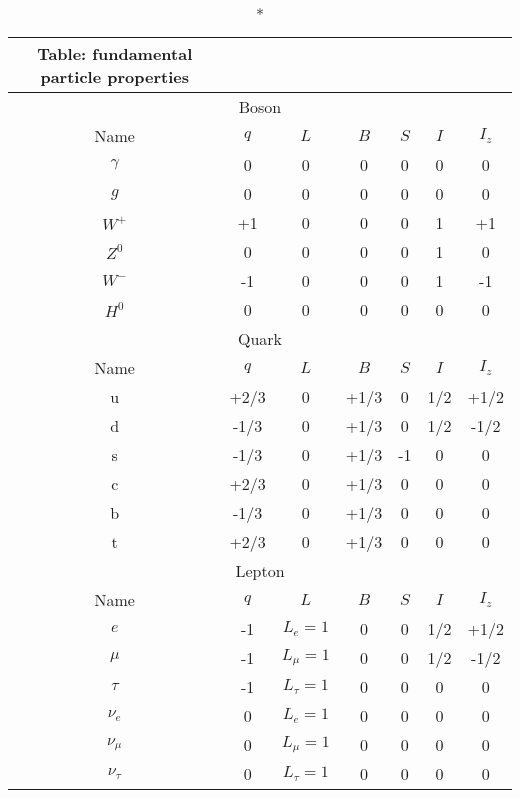 \documentclass[../../../main.tex]{subfiles}
\begin{document}
\begin{longtable}{ccccccc}
    \caption*{Table: fundamental particle properties}\\
    \toprule
    \multicolumn{7}{c}{Boson}\\
    \midrule
    Name & $q$  & $L$        & $B$  & $S$ & $I$ & $I_z$ \\
    \midrule
    $\gamma$    & 0    & 0          & 0    & 0   & 0   & 0     \\
    $g$    & 0    & 0          & 0    & 0   & 0   & 0     \\
    $W^+$   & +1   & 0          & 0    & 0   & 1   & +1    \\
    $Z^0$    & 0    & 0          & 0    & 0   & 1   & 0     \\
    $W^-$   & -1   & 0          & 0    & 0   & 1   & -1    \\
    $H^0$    & 0    & 0          & 0    & 0   & 0   & 0     \\
    \bottomrule
    \toprule
    \multicolumn{7}{c}{Quark}                           \\
    \midrule
    Name & $q$  & $L$        & $B$  & $S$ & $I$ & $I_z$ \\
    \midrule
    u    & +2/3 & 0       & +1/3 & 0   & 1/2 & +1/2  \\
    d    & -1/3 & 0        & +1/3 & 0   & 1/2 & -1/2  \\
    s    & -1/3 & 0        & +1/3 & -1  & 0   & 0     \\
    c    & +2/3 & 0        & +1/3 & 0   & 0   & 0     \\
    b    & -1/3 & 0        & +1/3 & 0   & 0   & 0     \\
    t    & +2/3 & 0        & +1/3 & 0   & 0   & 0     \\
    \bottomrule
    \toprule
    \multicolumn{7}{c}{Lepton}                          \\
    \midrule
    Name & $q$  & $L$        & $B$  & $S$ & $I$ & $I_z$ \\
    \midrule
    $e$    & -1   & $L_e=1$    & 0    & 0   & 1/2 & +1/2  \\
    $\mu$   & -1   & $L_\mu=1$  & 0    & 0   & 1/2 & -1/2  \\
    $\tau$  & -1   & $L_\tau=1$ & 0    & 0   & 0   & 0     \\
    $\nu_e$ & 0    & $L_e=1$    & 0    & 0   & 0   & 0     \\
    $\nu_\mu$ & 0    & $L_\mu=1$  & 0    & 0   & 0   & 0     \\
    $\nu_\tau$ & 0    & $L_\tau=1$ & 0    & 0   & 0   & 0    \\
    \bottomrule
\end{longtable}
\end{document}

